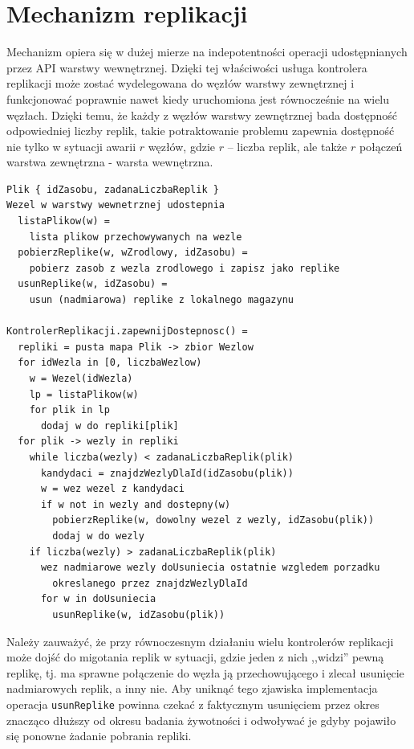 \documentclass[a4paper,11pt]{article}
\begin{document}
\section{Mechanizm replikacji}
Mechanizm opiera się w dużej mierze na indepotentności operacji
udostępnianych przez API warstwy wewnętrznej.  Dzięki tej właściwości
usługa kontrolera replikacji może zostać wydelegowana do węzłów warstwy
zewnętrznej i funkcjonować poprawnie nawet kiedy uruchomiona jest
równocześnie na wielu węzłach.  Dzięki temu, że każdy z węzłów warstwy
zewnętrznej bada dostępność odpowiedniej liczby replik, takie
potraktowanie problemu zapewnia dostępność nie tylko w sytuacji awarii
$r$ węzłów, gdzie $r$ -- liczba replik, ale także $r$ połączeń warstwa
zewnętrzna - warsta wewnętrzna.

\begin{lstlisting}
Plik { idZasobu, zadanaLiczbaReplik }
Wezel w warstwy wewnetrznej udostepnia
  listaPlikow(w) =
    lista plikow przechowywanych na wezle
  pobierzReplike(w, wZrodlowy, idZasobu) =
    pobierz zasob z wezla zrodlowego i zapisz jako replike
  usunReplike(w, idZasobu) =
    usun (nadmiarowa) replike z lokalnego magazynu

KontrolerReplikacji.zapewnijDostepnosc() =
  repliki = pusta mapa Plik -> zbior Wezlow
  for idWezla in [0, liczbaWezlow)
    w = Wezel(idWezla)
    lp = listaPlikow(w)
    for plik in lp
      dodaj w do repliki[plik]
  for plik -> wezly in repliki
    while liczba(wezly) < zadanaLiczbaReplik(plik)
      kandydaci = znajdzWezlyDlaId(idZasobu(plik))
      w = wez wezel z kandydaci
      if w not in wezly and dostepny(w)
        pobierzReplike(w, dowolny wezel z wezly, idZasobu(plik))
        dodaj w do wezly
    if liczba(wezly) > zadanaLiczbaReplik(plik)
      wez nadmiarowe wezly doUsuniecia ostatnie wzgledem porzadku
        okreslanego przez znajdzWezlyDlaId
      for w in doUsuniecia
        usunReplike(w, idZasobu(plik))
\end{lstlisting}

Należy zauważyć, że przy równoczesnym działaniu wielu kontrolerów
replikacji może dojść do migotania replik w sytuacji, gdzie jeden z nich
,,widzi'' pewną replikę, tj. ma sprawne połączenie do węzła ją
przechowującego i zlecał usunięcie nadmiarowych replik, a inny nie.
Aby uniknąć tego zjawiska implementacja operacja \texttt{usunReplike}
powinna czekać z faktycznym usunięciem przez okres znacząco dłuższy
od okresu badania żywotności i odwoływać je gdyby pojawiło się ponowne
żadanie pobrania repliki.
\end{document}
